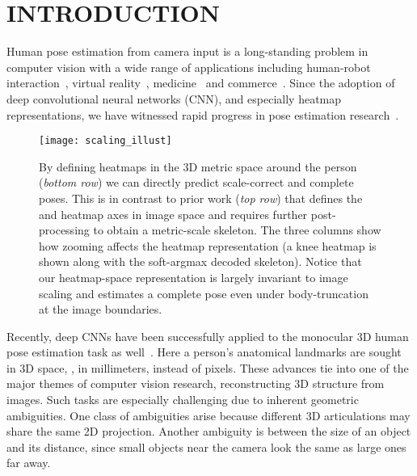 \section{\uppercase{Introduction}}
Human pose estimation from camera input is a long-standing problem in computer vision with a wide range of applications including human-robot interaction~\cite{Zimmermann18ICRA}, virtual reality~\cite{Alldieck2018CVPR}, medicine~\cite{Belagiannis16MAVIS,Srivastav18Arxiv} and commerce~\cite{Neverova18ECCV}.
Since the adoption of deep convolutional neural networks (CNN), and especially heatmap representations, we have witnessed rapid progress in pose estimation research~\cite{Newell16ECCV,Yang17CVPR,Ke18ECCV}.
\begin{figure}[t]
\centering
\texttt{[image: scaling\_illust]}\\
\caption{By defining heatmaps in the 3D metric space around the person (\emph{bottom row}) we can directly predict scale-correct and complete poses.
This is in contrast to prior work (\emph{top row}) that defines the  and  heatmap axes in image space and requires further post-processing to obtain a metric-scale skeleton.
The three columns show how zooming affects the heatmap representation (a knee heatmap is shown along with the soft-argmax decoded skeleton).
Notice that our heatmap-space representation is largely invariant to image scaling and estimates a complete pose even under body-truncation at the image boundaries.
}
\label{fig:volume_visu}
\end{figure}
Recently, deep CNNs have been successfully applied to the monocular 3D human pose estimation task as well~\cite{Martinez17ICCV,Mehta17TOG,Zhou17ICCV,Luo18BMVC,Nibali19WACV}.
Here a person's anatomical landmarks are sought in 3D space, \ie, in millimeters, instead of pixels.
These advances tie into one of the major themes of computer vision research, reconstructing 3D structure from images.
Such tasks are especially challenging due to inherent geometric ambiguities.
One class of ambiguities arise because different 3D articulations may share the same 2D projection.
Another ambiguity is between the size of an object and its distance, since small objects near the camera look the same as large ones far away.

